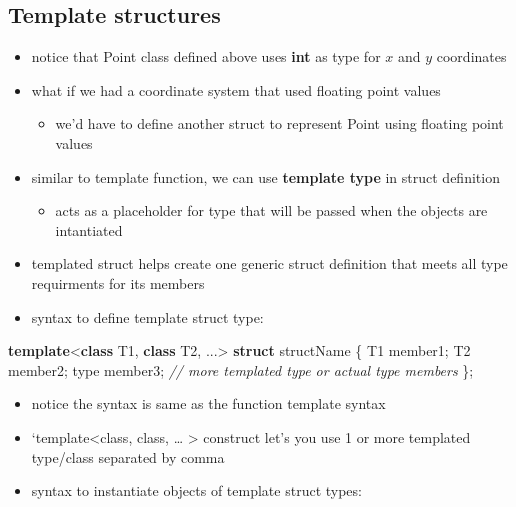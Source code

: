 \documentclass[11pt]{article}
\providecommand{\tightlist}{%
      \setlength{\itemsep}{0pt}\setlength{\parskip}{0pt}}
\newenvironment{Shaded}{}{}
\newcommand{\KeywordTok}[1]{\textcolor[rgb]{0.00,0.44,0.13}{\textbf{{#1}}}}
\newcommand{\CommentTok}[1]{\textcolor[rgb]{0.38,0.63,0.69}{\textit{{#1}}}}
\newcommand{\NormalTok}[1]{{#1}}
\newcommand{\OperatorTok}[1]{\textcolor[rgb]{0.40,0.40,0.40}{{#1}}}
\begin{document}
    \hypertarget{template-structures}{%
\subsection{Template structures}\label{template-structures}}

\begin{itemize}
\tightlist
\item
  notice that Point class defined above uses \textbf{int} as type for
  \(x\) and \(y\) coordinates
\item
  what if we had a coordinate system that used floating point values

  \begin{itemize}
  \tightlist
  \item
    we'd have to define another struct to represent Point using floating
    point values
  \end{itemize}
\item
  similar to template function, we can use \textbf{template type} in
  struct definition

  \begin{itemize}
  \tightlist
  \item
    acts as a placeholder for type that will be passed when the objects
    are intantiated
  \end{itemize}
\item
  templated struct helps create one generic struct definition that meets
  all type requirments for its members
\item
  syntax to define template struct type:
\end{itemize}

\begin{Shaded}
\begin{Highlighting}[]
\KeywordTok{template}\OperatorTok{\textless{}}\KeywordTok{class}\NormalTok{ T1}\OperatorTok{,} \KeywordTok{class}\NormalTok{ T2}\OperatorTok{,} \OperatorTok{...\textgreater{}}
\KeywordTok{struct}\NormalTok{ structName }\OperatorTok{\{}
\NormalTok{    T1 member1}\OperatorTok{;}
\NormalTok{    T2 member2}\OperatorTok{;}
\NormalTok{    type member3}\OperatorTok{;}
    \CommentTok{// more templated type or actual type members}
\OperatorTok{\};}
\end{Highlighting}
\end{Shaded}

\begin{itemize}
\item
  notice the syntax is same as the function template syntax
\item
  `template\textless class, class, \ldots{} \textgreater{} construct
  let's you use 1 or more templated type/class separated by comma
\item
  syntax to instantiate objects of template struct types:
\end{itemize}
\end{document}
